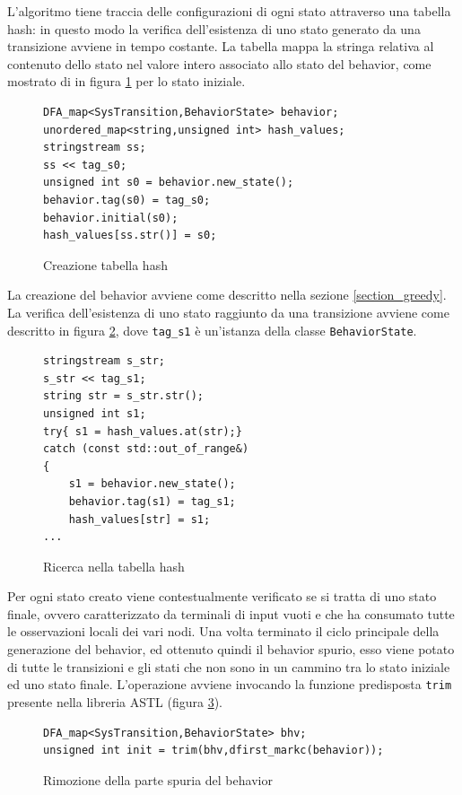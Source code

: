 L'algoritmo tiene traccia delle configurazioni di ogni stato attraverso una tabella hash: in questo modo la verifica dell'esistenza di uno stato generato da una transizione avviene in tempo costante. La tabella mappa la stringa relativa al contenuto dello stato nel valore intero associato allo stato del behavior, come mostrato di in figura \ref{code:hash_tab} per lo stato iniziale.

\begin{figure}[htbp]
\begin{verbatim}
DFA_map<SysTransition,BehaviorState> behavior;
unordered_map<string,unsigned int> hash_values;
stringstream ss;
ss << tag_s0;
unsigned int s0 = behavior.new_state();
behavior.tag(s0) = tag_s0;
behavior.initial(s0);
hash_values[ss.str()] = s0;
\end{verbatim}
\caption{Creazione tabella hash}
\label{code:hash_tab}
\end{figure}

La creazione del behavior avviene come descritto nella sezione \ref{section_greedy}.
La verifica dell'esistenza di uno stato raggiunto da una transizione avviene come descritto in figura \ref{code:ricerca_hash}, dove \verb|tag_s1| è un'istanza della classe \verb|BehaviorState|.

\begin{figure}[htbp]
\begin{verbatim}
stringstream s_str;
s_str << tag_s1;
string str = s_str.str();
unsigned int s1;
try{ s1 = hash_values.at(str);}
catch (const std::out_of_range&)
{
    s1 = behavior.new_state();
    behavior.tag(s1) = tag_s1;
    hash_values[str] = s1;
...
\end{verbatim}
\caption{Ricerca nella tabella hash}
\label{code:ricerca_hash}
\end{figure}

Per ogni stato creato viene contestualmente verificato se si tratta di uno stato finale, ovvero caratterizzato da terminali di input vuoti e che ha consumato tutte le osservazioni locali dei vari nodi.
Una volta terminato il ciclo principale della generazione del behavior, ed ottenuto quindi il behavior spurio, esso viene potato di tutte le transizioni e gli stati che non sono in un cammino tra lo stato iniziale ed uno stato finale. L'operazione avviene invocando la funzione predisposta \verb|trim| presente nella libreria ASTL (figura \ref{code:trim}).

\begin{figure}[htbp]
\begin{verbatim}
DFA_map<SysTransition,BehaviorState> bhv;
unsigned int init = trim(bhv,dfirst_markc(behavior));
\end{verbatim}
\caption{Rimozione della parte spuria del behavior}
\label{code:trim}
\end{figure}

